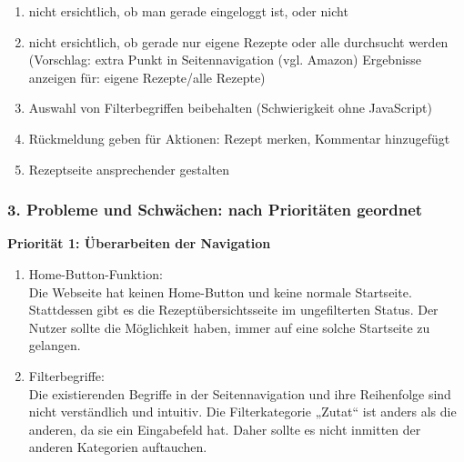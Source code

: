 \documentclass[parskip,10pt,abstracton]{scrartcl}
\newcommand{\sbt}{\begin{picture}(-1,1)(-1,-3)\circle*{3}\end{picture}\ } %
\begin{document}
\begin{itemize}
\begin{enumerate}[o]
\item nicht ersichtlich, ob man gerade eingeloggt ist, oder nicht\\

\item nicht ersichtlich, ob gerade nur eigene Rezepte oder alle durchsucht werden\\
(Vorschlag: extra Punkt in Seitennavigation (vgl. Amazon) Ergebnisse anzeigen für: eigene Rezepte/alle Rezepte)

\item Auswahl von Filterbegriffen beibehalten (Schwierigkeit ohne JavaScript)

\item Rückmeldung geben für Aktionen: Rezept merken, Kommentar hinzugefügt
\item Rezeptseite ansprechender gestalten
\end{enumerate}
\end{itemize}
\hrulefill


\subsubsection*{3. Probleme und Schwächen: nach Prioritäten geordnet}


\textbf{Priorität 1: Überarbeiten der Navigation}
\begin{enumerate}[\sbt]
 \item Home-Button-Funktion:\\
 Die Webseite hat keinen Home-Button und keine normale Startseite. Stattdessen gibt es die Rezeptübersichtsseite im ungefilterten Status. Der Nutzer sollte die Möglichkeit haben, immer auf eine solche Startseite zu gelangen.
 \item Filterbegriffe:\\
 Die existierenden Begriffe in der Seitennavigation und ihre Reihenfolge sind nicht verständlich und intuitiv. Die Filterkategorie „Zutat“ ist anders als die anderen, da sie ein Eingabefeld hat. Daher sollte es nicht inmitten der anderen Kategorien auftauchen.\\
\end{enumerate}
\end{document}
